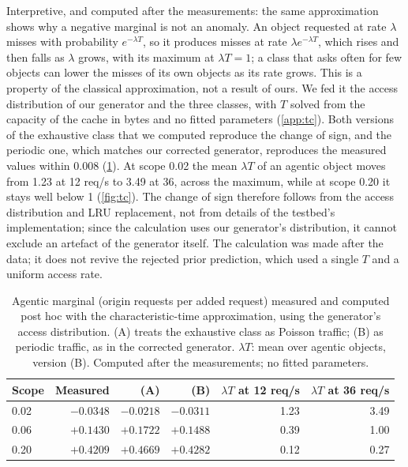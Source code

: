 Interpretive, and computed after the measurements: the same approximation shows why a
negative marginal is not an anomaly.
An object requested at rate $\lambda$ misses with probability $e^{-\lambda T}$, so it
produces misses at rate $\lambda e^{-\lambda T}$, which rises and then falls as $\lambda$
grows, with its maximum at $\lambda T = 1$; a class that asks often for few objects can
lower the misses of its own objects as its rate grows.
This is a property of the classical approximation, not a result of ours.
We fed it the access distribution of our generator and the three classes, with $T$ solved
from the capacity of the cache in bytes and no fitted parameters (\cref{app:tc}).
Both versions of the exhaustive class that we computed reproduce the change of sign, and
the periodic one, which matches our corrected generator, reproduces the measured values
within 0.008 (\cref{tab:tc}).
At scope 0.02 the mean $\lambda T$ of an agentic object moves from 1.23 at 12 req/s to
3.49 at 36, across the maximum, while at scope 0.20 it stays well below 1
(\cref{fig:tc}).
The change of sign therefore follows from the access distribution and LRU replacement, not
from details of the testbed's implementation; since the calculation uses our generator's
distribution, it cannot exclude an artefact of the generator itself.
The calculation was made after the data; it does not revive the rejected prior prediction,
which used a single $T$ and a uniform access rate.

\begin{table}[t]
\caption{Agentic marginal (origin requests per added request) measured and computed post hoc
with the characteristic-time approximation, using the generator's access distribution.
(A) treats the exhaustive class as Poisson traffic; (B) as periodic traffic, as in the
corrected generator. $\lambda T$: mean over agentic objects, version (B). Computed after the
measurements; no fitted parameters.}
\label{tab:tc}
\centering\small
\begin{tabular}{@{}lrrrrr@{}}
\toprule
Scope & Measured & (A) & (B) & $\lambda T$ at 12 req/s & $\lambda T$ at 36 req/s \\
\midrule
0.02 & $-0.0348$ & $-0.0218$ & $-0.0311$ & 1.23 & 3.49 \\
0.06 & $+0.1430$ & $+0.1722$ & $+0.1488$ & 0.39 & 1.00 \\
0.20 & $+0.4209$ & $+0.4669$ & $+0.4282$ & 0.12 & 0.27 \\
\bottomrule
\end{tabular}
\end{table}

